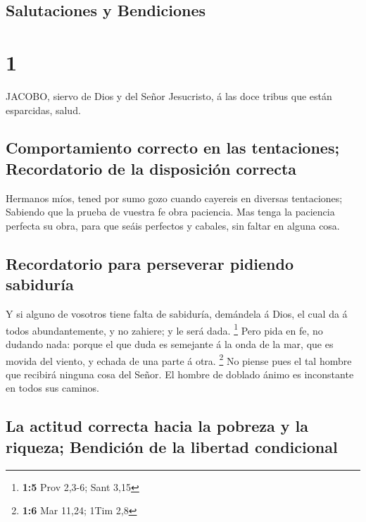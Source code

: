 \hypertarget{salutaciones-y-bendiciones}{%
\subsection{Salutaciones y
Bendiciones}\label{salutaciones-y-bendiciones}}

\hypertarget{section}{%
\section{1}\label{section}}

 JACOBO, siervo de Dios y del Señor Jesucristo, á las doce
tribus que están esparcidas, salud.

\hypertarget{comportamiento-correcto-en-las-tentaciones-recordatorio-de-la-disposiciuxf3n-correcta}{%
\subsection{Comportamiento correcto en las tentaciones; Recordatorio de
la disposición
correcta}\label{comportamiento-correcto-en-las-tentaciones-recordatorio-de-la-disposiciuxf3n-correcta}}

 Hermanos míos, tened por sumo gozo cuando cayereis en
diversas tentaciones;  Sabiendo que la prueba de vuestra fe
obra paciencia.  Mas tenga la paciencia perfecta su obra,
para que seáis perfectos y cabales, sin faltar en alguna cosa.

\hypertarget{recordatorio-para-perseverar-pidiendo-sabiduruxeda}{%
\subsection{Recordatorio para perseverar pidiendo
sabiduría}\label{recordatorio-para-perseverar-pidiendo-sabiduruxeda}}

 Y si alguno de vosotros tiene falta de sabiduría, demándela
á Dios, el cual da á todos abundantemente, y no zahiere; y le será dada.
\footnote{\textbf{1:5} Prov 2,3-6; Sant 3,15}  Pero pida en
fe, no dudando nada: porque el que duda es semejante á la onda de la
mar, que es movida del viento, y echada de una parte á otra. \footnote{\textbf{1:6}
  Mar 11,24; 1Tim 2,8}  No piense pues el tal hombre que
recibirá ninguna cosa del Señor.  El hombre de doblado ánimo
es inconstante en todos sus caminos.

\hypertarget{la-actitud-correcta-hacia-la-pobreza-y-la-riqueza-bendiciuxf3n-de-la-libertad-condicional}{%
\subsection{La actitud correcta hacia la pobreza y la riqueza; Bendición
de la libertad
condicional}\label{la-actitud-correcta-hacia-la-pobreza-y-la-riqueza-bendiciuxf3n-de-la-libertad-condicional}}

